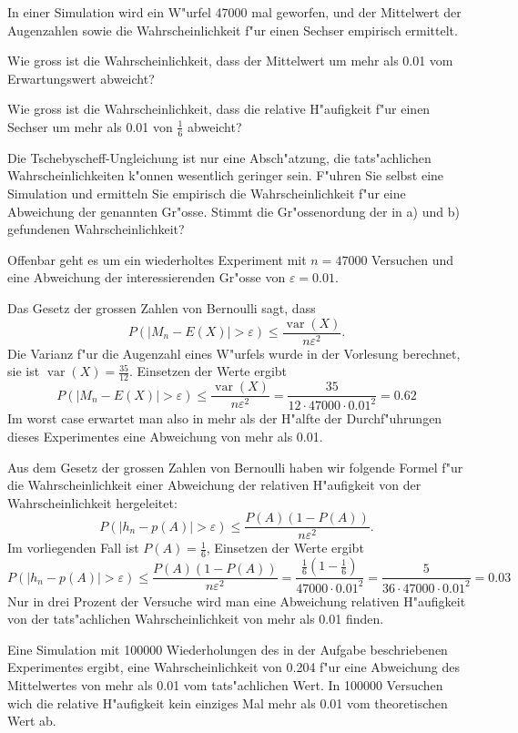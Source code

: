 In einer Simulation wird ein W"urfel 47000 mal geworfen, und der Mittelwert
der Augenzahlen sowie die Wahrscheinlichkeit f"ur einen Sechser empirisch
ermittelt.

\begin{teilaufgaben}
\item Wie gross ist die Wahrscheinlichkeit, dass der Mittelwert um mehr
als 0.01 vom Erwartungswert abweicht?
\item Wie gross ist die Wahrscheinlichkeit, dass die relative H"aufigkeit
f"ur einen Sechser um mehr als 0.01 von $\frac16$ abweicht?
\item Die Tschebyscheff-Ungleichung ist nur eine Absch"atzung, die
tats"achlichen Wahrscheinlichkeiten k"onnen wesentlich geringer sein.
F"uhren Sie selbst eine Simulation und ermitteln Sie empirisch die
Wahrscheinlichkeit f"ur eine Abweichung der genannten Gr"osse. 
Stimmt die Gr"ossenordung der in a) und b) gefundenen Wahrscheinlichkeit?
\end{teilaufgaben}


\begin{loesung}
Offenbar geht es um ein wiederholtes Experiment mit $n=47000$ Versuchen
und eine Abweichung der interessierenden Gr"osse von $\varepsilon=0.01$.
\begin{teilaufgaben}
\item
Das Gesetz der grossen Zahlen von Bernoulli sagt, dass 
\[
P(|M_n-E(X)|>\varepsilon) \le
\frac{\operatorname{var}(X)}{n\varepsilon^2}.
\]
Die Varianz f"ur die Augenzahl eines W"urfels wurde in der Vorlesung berechnet,
sie ist
$\operatorname{var}(X)=\frac{35}{12}.$
Einsetzen der Werte ergibt
\[
P(|M_n-E(X)|>\varepsilon)\le
\frac{\operatorname{var}(X)}{n\varepsilon^2}
=\frac{35}{12\cdot 47000\cdot 0.01^2}=0.62
\]
Im worst case erwartet man also in mehr als der H"alfte der Durchf"uhrungen
dieses Experimentes eine Abweichung von mehr als  0.01.
\item
Aus dem Gesetz der grossen Zahlen von Bernoulli haben wir folgende Formel
f"ur die Wahrscheinlichkeit einer Abweichung der relativen H"aufigkeit von
der Wahrscheinlichkeit hergeleitet:
\[
P(|h_n-p(A)|>\varepsilon)\le \frac{P(A)(1-P(A))}{n\varepsilon^2}.
\]
Im vorliegenden Fall ist $P(A)=\frac16$, Einsetzen der Werte ergibt
\[
P(|h_n-p(A)|>\varepsilon)\le \frac{P(A)(1-P(A))}{n\varepsilon^2}
=\frac{\frac16(1-\frac16)}{47000\cdot 0.01^2}
=\frac{5}{36\cdot 47000\cdot 0.01^2}
=0.03
\]
Nur in drei Prozent der Versuche wird man eine Abweichung relativen
H"aufigkeit von der tats"achlichen Wahrscheinlichkeit von mehr als 0.01
finden.
\item Eine Simulation mit 100000 Wiederholungen des in der Aufgabe
beschriebenen Experimentes ergibt, eine Wahrscheinlichkeit von 0.204
f"ur eine Abweichung des Mittelwertes von mehr als 0.01 vom tats"achlichen
Wert. In 100000 Versuchen wich die relative H"aufigkeit kein einziges
Mal mehr als 0.01 vom theoretischen Wert ab.
\qedhere
\end{teilaufgaben}
\end{loesung}


